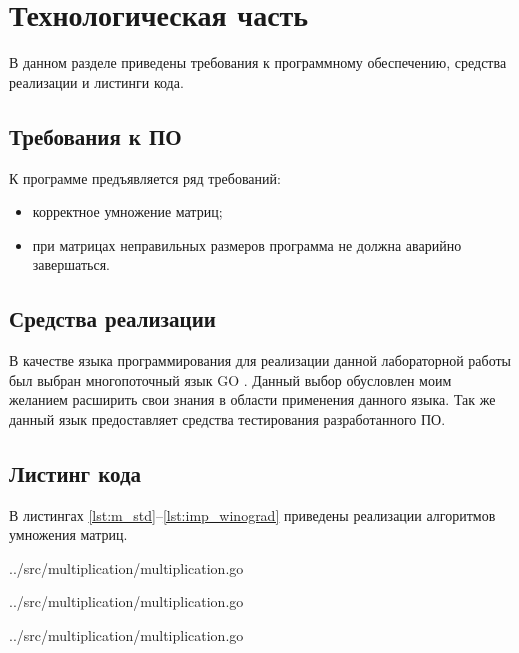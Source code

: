 \chapter{Технологическая часть}

В данном разделе приведены требования к программному обеспечению, средства реализации и листинги кода.

\section{Требования к ПО}

К программе предъявляется ряд требований:
\begin{itemize}
	\item корректное умножение матриц;
	\item при матрицах неправильных размеров программа не должна аварийно завершаться.
\end{itemize}

\section{Средства реализации}

В качестве языка программирования для реализации данной лабораторной работы был выбран многопоточный язык GO \cite{golang}. Данный выбор обусловлен моим желанием расширить свои знания в области применения данного языка. Так же данный язык предоставляет средства тестирования разработанного ПО.

\clearpage

\section{Листинг кода}

В листингах \ref{lst:m_std}--\ref{lst:imp_winograd} приведены реализации алгоритмов умножения матриц.

\begin{lstinputlisting}[
	caption={Классический},
	label={lst:m_std},
	style={go},
	linerange={14-29},
	]{../src/multiplication/multiplication.go}
\end{lstinputlisting}

\begin{lstinputlisting}[
	caption={Виноград},
	label={lst:m_winograd},
	style={go},
	linerange={32-84},
	]{../src/multiplication/multiplication.go}
\end{lstinputlisting}

\begin{lstinputlisting}[
	caption={Оптимизированный Виноград},
	label={lst:imp_winograd},
	style={go},
	linerange={87-144},
	]{../src/multiplication/multiplication.go}
\end{lstinputlisting}

